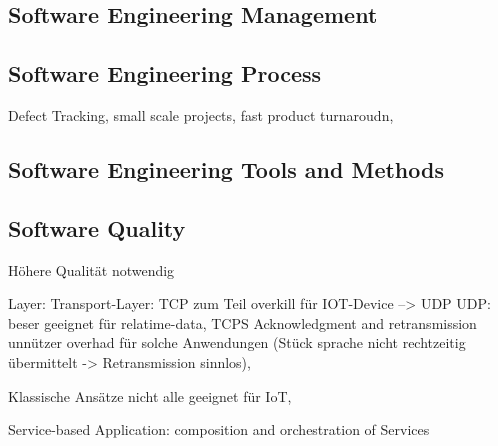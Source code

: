 \subsection{Software Engineering Management}


\subsection{Software Engineering Process}
Defect Tracking, small scale projects, fast product turnaroudn, 

\subsection{Software Engineering Tools and Methods}


\subsection{Software Quality}
Höhere Qualität notwendig




Layer: Transport-Layer: TCP zum Teil overkill für IOT-Device --> UDP
UDP: beser geeignet für relatime-data, TCPS Acknowledgment and retransmission unnützer overhad für solche Anwendungen (Stück sprache nicht rechtzeitig übermittelt -> Retransmission sinnlos), 


Klassische Ansätze nicht alle geeignet für IoT, 

Service-based Application: composition and orchestration of Services